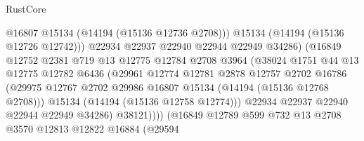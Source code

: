 \begin{lexlean}{RustCore}
\begin{coremodule}
                                      @16807
                                      @15134
                                      (@14194 (@15136 @12736 @2708)))
                                    @15134
                                    (@14194 (@15136 @12726 @12742)))
                                  @22934
                                  @22937
                                  @22940
                                  @22944
                                  @22949
                                  @34286)
                                (@16849
                                  @12752
                                  @2381
                                  @719
                                  @13
                                  @12775
                                  @12784
                                  @2708
                                  @3964
                                  (@38024
                                    @1751
                                    @44
                                    @13
                                    @12775
                                    @12782
                                    @6436
                                    (@29961
                                      @12774
                                      @12781
                                      @2878
                                      @12757
                                      @2702
                                      @16786
                                      (@29975
                                        @12767
                                        @2702
                                        @29986
                                        @16807
                                        @15134
                                        (@14194 (@15136 @12768 @2708)))
                                      @15134
                                      (@14194 (@15136 @12758 @12774)))
                                    @22934
                                    @22937
                                    @22940
                                    @22944
                                    @22949
                                    @34286)
                                  @38121))))
                          (@16849
                            @12789
                            @599
                            @732
                            @13
                            @2708
                            @3570
                            @12813
                            @12822
                            @16884
                            (@29594

\end{coremodule}
\end{lexlean}
